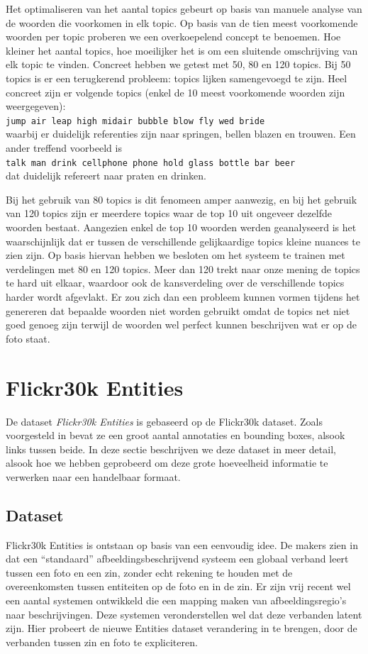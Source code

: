 Het optimaliseren van het aantal topics gebeurt op basis van manuele analyse van de woorden die voorkomen in elk topic. Op basis van de tien meest voorkomende woorden per topic proberen we een overkoepelend concept te benoemen. Hoe kleiner het aantal topics, hoe moeilijker het is om een sluitende omschrijving van elk topic te vinden. Concreet hebben we getest met 50, 80 en 120 topics. Bij 50 topics is er een terugkerend probleem: topics lijken samengevoegd te zijn. Heel concreet zijn er volgende topics (enkel de 10 meest voorkomende woorden zijn weergegeven): \\
\texttt{jump air leap high midair bubble blow fly wed bride}
\\
waarbij er duidelijk referenties zijn naar springen, bellen blazen en trouwen. Een ander treffend voorbeeld is \\
\texttt{talk man drink cellphone phone hold glass bottle bar beer}
\\ dat duidelijk refereert naar praten en drinken.

Bij het gebruik van 80 topics is dit fenomeen amper aanwezig, en bij het gebruik van 120 topics zijn er meerdere topics waar de top 10 uit ongeveer dezelfde woorden bestaat. Aangezien enkel de top 10 woorden werden geanalyseerd is het waarschijnlijk dat er tussen de verschillende gelijkaardige topics kleine nuances te zien zijn. Op basis hiervan hebben we besloten om het systeem te trainen met verdelingen met 80 en 120 topics. Meer dan 120 trekt naar onze mening de topics te hard uit elkaar, waardoor ook de kansverdeling over de verschillende topics harder wordt afgevlakt. Er zou zich dan een probleem kunnen vormen tijdens het genereren dat bepaalde woorden niet worden gebruikt omdat de topics net niet goed genoeg zijn terwijl de woorden wel perfect kunnen beschrijven wat er op de foto staat.

\section{Flickr30k Entities}
De dataset \emph{Flickr30k Entities} is gebaseerd op de Flickr30k dataset. Zoals voorgesteld in  bevat ze een groot aantal annotaties en bounding boxes, alsook links tussen beide. In deze sectie beschrijven we deze dataset in meer detail, alsook hoe we hebben geprobeerd om deze grote hoeveelheid informatie te verwerken naar een handelbaar formaat.

\subsection{Dataset}
\label{sub:Dataset}
Flickr30k Entities is ontstaan op basis van een eenvoudig idee. De makers zien in dat een ``standaard'' afbeeldingsbeschrijvend systeem een globaal verband leert tussen een foto en een zin, zonder echt rekening te houden met de overeenkomsten tussen entiteiten op de foto en in de zin. Er zijn vrij recent wel een aantal systemen ontwikkeld die een mapping maken van afbeeldingsregio's naar beschrijvingen. Deze systemen veronderstellen wel dat deze verbanden latent zijn. Hier probeert de nieuwe Entities dataset verandering in te brengen, door de verbanden tussen zin en foto te expliciteren.


